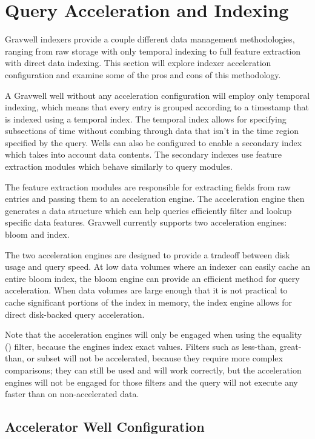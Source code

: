 {\section{Query Acceleration and Indexing}
\label{sec:acceleration}
Gravwell indexers provide a couple different data management
methodologies, ranging from raw storage with only temporal indexing to
full feature extraction with direct data indexing. This section
will explore indexer acceleration configuration and examine some of the
pros and cons of this methodology.

A Gravwell well without any acceleration configuration will employ only
temporal indexing, which means that every entry is grouped according to a
timestamp that is indexed using a temporal index. The temporal index
allows for specifying subsections of time without combing through data
that isn't in the time region specified by the query. Wells can also be
configured to enable a secondary index which takes into account data
contents. The secondary indexes use feature extraction modules which
behave similarly to query modules.

The feature extraction modules are responsible for extracting fields
from raw entries and passing them to an acceleration engine. The
acceleration engine then generates a data structure which can help
queries efficiently filter and lookup specific data features. Gravwell
currently supports two acceleration engines: bloom and index.

The two acceleration engines are designed to provide a tradeoff between
disk usage and query speed. At low data volumes where an indexer can
easily cache an entire bloom index, the bloom engine can provide an
efficient method for query acceleration. When data volumes are large
enough that it is not practical to cache significant portions of the
index in memory, the index engine allows for direct disk-backed query
acceleration.

Note that the acceleration engines will only be engaged when using
the equality (\code{==}) filter, because
the engines index exact values. Filters such as less-than, great-than,
or subset will not be accelerated, because they require more complex
comparisons; they can still be used and will work correctly, but the acceleration
engines will not be engaged for those filters and the query will
not execute any faster than on non-accelerated data.

\subsection{Accelerator Well Configuration}

}
